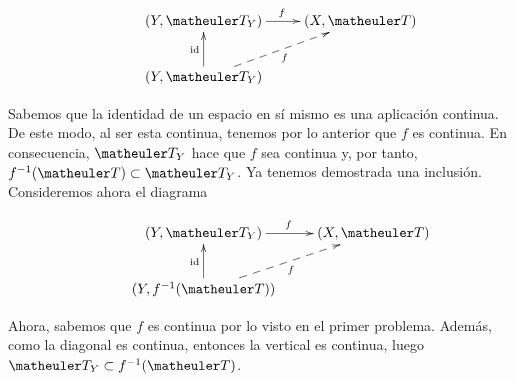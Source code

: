 \begin{equation*}
\xymatrix{
&(Y,\T_Y) \ar[r]^f
&(X,\T) \\
&(Y,\T_Y) \ar@{-->}[ru]_f \ar[u]^{\text{id}}}
\end{equation*}

Sabemos que la identidad de un espacio en sí mismo es una aplicación continua. De este modo, al ser esta continua, tenemos por lo anterior que $f$ es continua. En consecuencia, $\T_Y$ hace que $f$ sea continua y, por tanto, $f^{-1}(\T)\subset \T_Y$. Ya tenemos demostrada una inclusión. \\

Consideremos ahora el diagrama 

\begin{equation*}
\xymatrix{
&(Y,\T_Y) \ar[r]^f
&(X,\T) \\
&(Y,f^{-1}(\T)) \ar@{-->}[ru]_f \ar[u]^{\text{id}}}
\end{equation*}

Ahora, sabemos que $f$ es continua por lo visto en el primer problema. Además, como la diagonal es continua, entonces la vertical es continua, luego $\T_Y \subset f^{-1}(\T)$. \\

